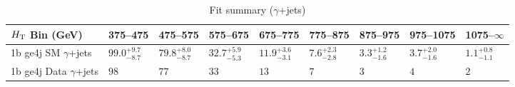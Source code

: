 \documentclass[8pt]{article}
\def\scalht{\mbox{$H_{\rm{T}}$}\xspace}
\newcommand\T{\rule{0pt}{2.6ex}}
\begin{document}
\begin{table}[ht!]
\caption{Fit summary ($\gamma$+jets)}
\label{tab:ensemble-summary}
\centering
\begin{tabular}{ lllllllll }

\hline
\scalht Bin (GeV)       & 375--475                       & 475--575                       & 575--675                       & 675--775                       & 775--875                       & 875--975                       & 975--1075                      & 1075--$\infty$                 \\ [1.000000ex]
\hline
1b ge4j SM $\gamma$+jets\T & $99.0^{+9.7}_{-8.7}$           & $79.8^{+8.0}_{-8.7}$           & $32.7^{+5.9}_{-5.3}$           & $11.9^{+3.6}_{-3.1}$           & $7.6^{+2.3}_{-2.8}$            & $3.3^{+1.2}_{-1.6}$            & $3.7^{+2.0}_{-1.6}$            & $1.1^{+0.8}_{-1.1}$            \\ 
1b ge4j Data $\gamma$+jets\T & $98$                           & $77$                           & $33$                           & $13$                           & $7$                            & $3$                            & $4$                            & $2$                            \\ 
\hline

\end{tabular}
\end{table}
\end{document}
